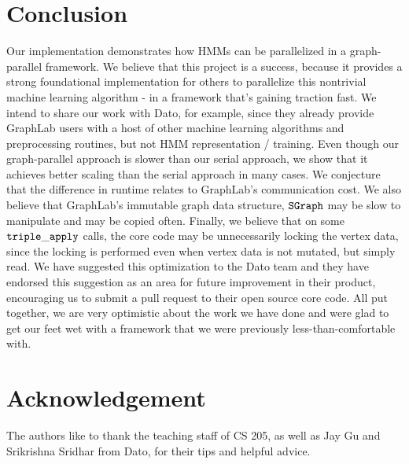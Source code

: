 \section{Conclusion}

Our implementation demonstrates how HMMs can be parallelized in a
graph-parallel framework.  We believe that this project is a success, because it provides a strong foundational implementation for others to parallelize this nontrivial machine learning algorithm - in a framework that's gaining traction fast.   We intend to share our work with Dato, for example, since they already provide GraphLab users with a host of other machine learning algorithms and preprocessing routines, but not HMM representation / training.  Even though our graph-parallel approach is slower than
our serial approach, we show that it achieves better scaling than the serial
approach in many cases. We conjecture that the difference in runtime relates to GraphLab's communication cost.  We also believe that GraphLab's immutable graph data structure, $\tt{SGraph}$ may be slow to manipulate and may be copied often.  Finally, we  believe that on some $\tt{triple\_apply}$ calls, the core code may be unnecessarily locking the vertex data, since the locking is performed even when vertex data is not mutated, but simply read.   We have suggested this optimization to the Dato team and they have endorsed this suggestion as an area for future improvement in their product, encouraging us to submit a pull request to their open source core code.  All put together, we are very optimistic about the work we have done and were glad to get our feet wet with a framework that we were previously less-than-comfortable with.
\section*{Acknowledgement}

The authors like to thank the teaching staff of CS 205, as well as Jay Gu and
Srikrishna Sridhar from Dato, for their tips and helpful advice.
